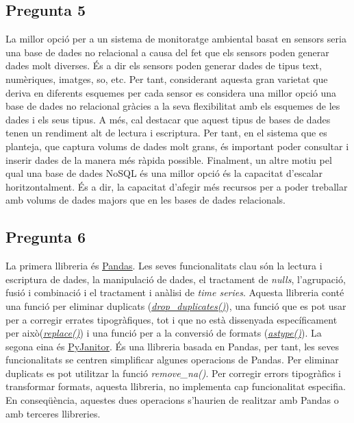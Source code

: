 \documentclass[a4paper,12pt]{report}
\begin{document}
\subsection*{Pregunta 5}
La millor opció per a un sistema de monitoratge ambiental basat en sensors seria una base de dades no relacional a causa del fet que els sensors poden generar dades molt diverses. És a dir els sensors poden generar dades de tipus text, numèriques, imatges, so, etc. Per tant, considerant aquesta gran varietat que deriva en diferents esquemes per cada sensor es considera una millor opció una base de dades no relacional gràcies a la seva flexibilitat amb els esquemes de les dades i els seus tipus. A més, cal destacar que aquest tipus de bases de dades tenen un rendiment alt de lectura i escriptura. Per tant, en el sistema que es planteja, que captura volums de dades molt grans, és important poder consultar i inserir dades de la manera més ràpida possible. Finalment, un altre motiu pel qual una base de dades NoSQL és una millor opció és la capacitat d'escalar horitzontalment. És a dir, la capacitat d'afegir més recursos per a poder treballar amb volums de dades majors que en les bases de dades relacionals.
\subsection*{Pregunta 6}
La primera llibreria és \href{https://pandas.pydata.org/docs/}{\underline{Pandas}}. Les seves funcionalitats clau són la lectura i escriptura de dades, la manipulació de dades, el tractament de \textit{nulls}, l'agrupació, fusió i combinació i el tractament i anàlisi de \textit{time series}. Aquesta llibreria conté una funció per eliminar duplicats (\href{https://pandas.pydata.org/docs/reference/api/pandas.DataFrame.drop_duplicates.html}{\underline{\textit{drop\_duplicates()}}}), una funció que es pot usar per a corregir errates tipogràfiques, tot i que no està dissenyada específicament per això(\href{https://pandas.pydata.org/docs/reference/api/pandas.DataFrame.replace.html}{\underline{\textit{replace()}}}) i una funció per a la conversió de formats (\href{https://pandas.pydata.org/docs/reference/api/pandas.DataFrame.astype.html}{\underline{\textit{astype()}}}).
La segona eina és \href{https://pyjanitor-devs.github.io/pyjanitor/}{\underline{PyJanitor}}. És una llibreria basada en Pandas, per tant, les seves funcionalitats se centren simplificar algunes operacions de Pandas. Per eliminar duplicats es pot utilitzar la funció \textit{remove\_na()}. Per corregir errors tipogràfics i transformar formats, aquesta llibreria, no implementa cap funcionalitat especifia. En conseqüència, aquestes dues operacions s'haurien de realitzar amb Pandas o amb terceres llibreries.
\end{document}
